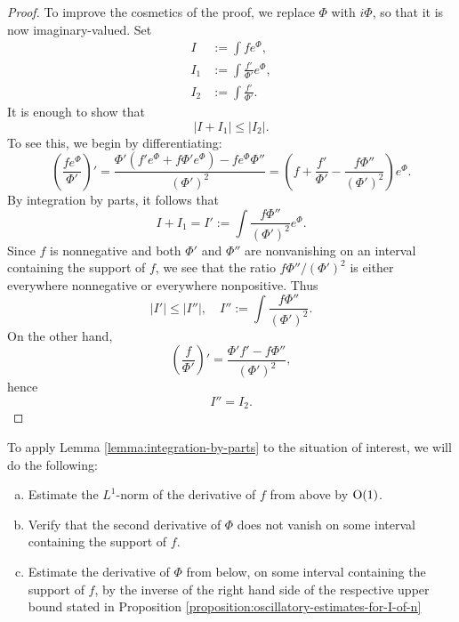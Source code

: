 \documentclass[reqno]{amsart} 
\begin{document}
\begin{proof}
  To improve the cosmetics of the proof, we replace $\Phi$ with $i \Phi$, so that it is now imaginary-valued.  Set
  \begin{align*}
    I &:=  \int f e ^{\Phi }, \\
    I_1 &:= \int \frac{f ' }{ \Phi ' } e ^{\Phi }, \\
    I_2 &:= \int \frac{f '}{ \Phi '}.
  \end{align*}
  It is enough to show that
  \begin{equation*}
    \lvert I + I_1 \rvert \leq \lvert I_2 \rvert.
  \end{equation*}
  To see this, we begin by differentiating:
  \begin{equation*}
    \left( \frac{f e ^\Phi }{ \Phi ' } \right)'
    =
    \frac{\Phi ' (f ' e ^\Phi + f \Phi ' e ^{\Phi }) - f e ^\Phi \Phi ''}{ (\Phi ')^2}
    =
    \left(     f
      +
      \frac{f' }{ \Phi '}
      - 
      \frac{f \Phi ''}{ (\Phi ')^2}
    \right) e ^\Phi.
  \end{equation*}
  By integration by parts, it follows that
  \begin{equation*}
    I + I_1 = I' := \int \frac{f \Phi '' }{ (\Phi ') ^2 } e ^{\Phi }. 
  \end{equation*}
  Since $f$ is nonnegative and both $\Phi '$ and $\Phi ''$ are nonvanishing on an interval containing the support of $f$, we see that the ratio $f \Phi '' / (\Phi ')^2$ is either everywhere nonnegative or everywhere nonpositive.  Thus
  \begin{equation*}
    |I'| \leq |I''|, \quad I'' := \int \frac{f \Phi '' }{ (\Phi ') ^2 }. 
  \end{equation*}
  On the other hand,
  \begin{equation*}
    \left( \frac{f}{ \Phi '} \right) ' = \frac{\Phi ' f ' - f \Phi ''}{ (\Phi ')^2},
  \end{equation*}
  hence
  \begin{equation*}
    I'' = I_2.
  \end{equation*}
\end{proof}


To apply Lemma \ref{lemma:integration-by-parts} to the situation of interest, we will do the following:
\begin{enumerate}[(a)]
\item Estimate the $L^1$-norm of the derivative of $f$ from above by $\operatorname{O}(1)$.
\item Verify that the second derivative of $\Phi$ does not vanish on some interval containing the support of $f$.
\item Estimate the derivative of $\Phi$ from below, on some interval containing the support of $f$, by the inverse of the right hand side of the respective upper bound stated in Proposition \ref{proposition:oscillatory-estimates-for-I-of-n}
\end{enumerate}
\end{document}
